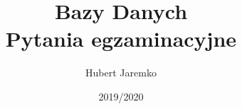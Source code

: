 \documentclass{unibooklet}
\title{%
\vskip 2cm
Bazy Danych \\
\large Pytania egzaminacyjne}
\author{Hubert Jaremko}
\date{2019/2020}
\begin{document}
    \makeTitlePage
    \tableofcontents
    \pagebreak

    
    \pagebreak
    
    
    \pagebreak
    
    
    \pagebreak
    
    \pagebreak
    
    \pagebreak
    
\end{document}
